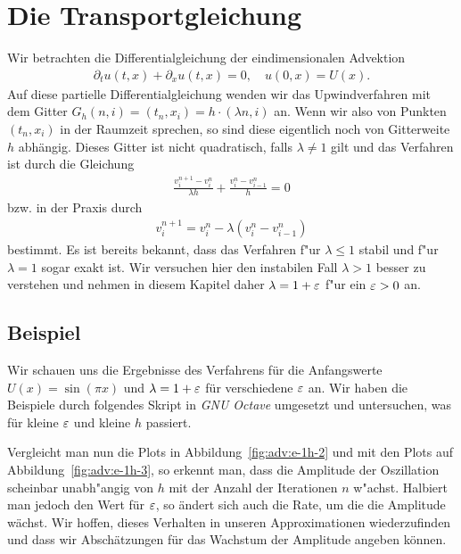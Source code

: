 \section{Die Transportgleichung}

Wir betrachten die Differentialgleichung der eindimensionalen Advektion
\begin{align}\label{eq:adv:pde}
\partial_t u(t, x) + \partial_x u(t, x) = 0, \quad u(0, x) = U(x).
\end{align}
Auf diese partielle Differentialgleichung wenden wir das Upwindverfahren mit dem Gitter $G_h(n,i) = (t_n, x_i) = h \cdot (\lambda n, i)$ an.
Wenn wir also von Punkten $(t_n, x_i)$ in der Raumzeit sprechen, so sind diese eigentlich noch von Gitterweite $h$ abhängig. 
Dieses Gitter ist nicht quadratisch, falls $\lambda \neq 1$ gilt und das Verfahren ist durch die Gleichung
\begin{align}\label{eq:adv:scheme_rechnung}
\frac {v^{n+1}_i - v^n_i} {\lambda h} + \frac {v^n_i - v^n_{i-1}} h = 0
\end{align}
bzw. in der Praxis durch
\begin{align}\label{eq:adv:scheme}
v^{n+1}_i = v^n_i - \lambda (v^n_i - v^n_{i-1})
\end{align}
bestimmt.
Es ist bereits bekannt, dass das Verfahren f"ur $\lambda \leq 1$ stabil und f"ur $\lambda = 1$ sogar exakt ist.
Wir versuchen hier den instabilen Fall $\lambda > 1$ besser zu verstehen und nehmen in diesem Kapitel daher $\lambda = 1 + \varepsilon$ f"ur ein $\varepsilon > 0$ an.



\subsection{Beispiel}

Wir schauen uns die Ergebnisse des Verfahrens für die Anfangswerte $U(x) = \sin(\pi x)$ und $\lambda = 1 + \varepsilon$ für verschiedene $\varepsilon$ an.
Wir haben die Beispiele durch folgendes Skript in \emph{GNU Octave} umgesetzt und untersuchen, was für kleine $\varepsilon$ und kleine $h$ passiert.




Vergleicht man nun die Plots in Abbildung~\ref{fig:adv:e-1h-2} und mit den Plots auf Abbildung~\ref{fig:adv:e-1h-3}, so erkennt man, dass die Amplitude der Oszillation scheinbar unabh"angig von $h$ mit der Anzahl der Iterationen $n$ w"achst.
Halbiert man jedoch den Wert für $\varepsilon$, so ändert sich auch die Rate, um die die Amplitude wächst.
Wir hoffen, dieses Verhalten in unseren Approximationen wiederzufinden und dass wir Abschätzungen für das Wachstum der Amplitude angeben können.



